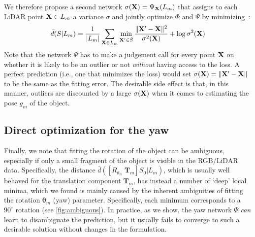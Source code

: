 We therefore propose a second network $\sigma(\mathbf{X}) = \Psi_{\mathbf{X}}(L_m)$ that assigns to each LiDAR point $\mathbf{X} \in L_m$ a variance $\sigma$ and jointly optimize $\Phi$ and $\Psi$ by minimizing~\cite{novotny17learning,kendall17what}:
\begin{equation}\label{e:distance}
  \bar d(S|L_m)
  =
  \frac{1}{|L_m|}
  \sum_{\mathbf{X} \in L_m}
  \min_{\mathbf{X}' \in \hat S}
  \frac{\|\mathbf{X}' - \mathbf{X} \|^2}{\sigma^2(\mathbf{X})}
  +
  \log \sigma^2(\mathbf{X})
\end{equation}
Note that the network $\Psi$ has to make a judgement call for every point $\mathbf{X}$ on whether it is likely to be an outlier or not \emph{without} having access to the loss.
A perfect prediction (i.e., one that minimizes the loss) would set $\sigma(\mathbf{X}) = \|\mathbf{X}' - \mathbf{X} \|$ to be the same as the fitting error.
The desirable side effect is that, in this manner, outliers are discounted by a large $\sigma(\mathbf{X})$ when it comes to estimating the pose $g_m$ of the object.


\subsection{Direct optimization for the yaw}\label{s:direct-yaw}


Finally, we note that fitting the rotation of the object can be ambiguous, especially if only a small fragment of the object is visible in the RGB/LiDAR data.
Specifically, the distance $\bar d([R_{\theta_m}~\mathbf{T}_m]S_0|L_m)$, which is usually well behaved for the translation component $\mathbf{T}_m$, has instead a number of `deep' local minima, which we found is mainly caused by the inherent ambiguities of fitting the rotation $\mathbf{\theta}_m$ (yaw) parameter.
Specifically, each minimum corresponds to a $90^{\circ}$ rotation (see \cref{fig:ambiguous}).
In practice, as we show, the yaw network $\Psi$ \emph{can} learn to disambiguate the prediction, but it usually fails to converge to such a desirable solution without changes in the formulation.

